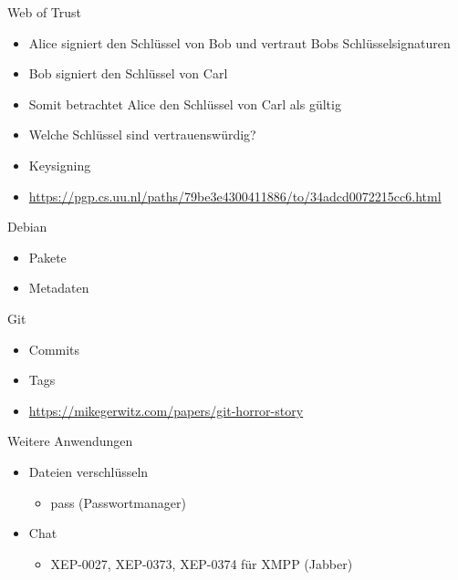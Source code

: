 \documentclass{beamer}
\begin{document}
\begin{frame}{Web of Trust}
    \begin{itemize}
        \item Alice signiert den Schlüssel von Bob und vertraut Bobs Schlüsselsignaturen
        \item Bob signiert den Schlüssel von Carl
        \item Somit betrachtet Alice den Schlüssel von Carl als gültig
    \end{itemize}
    \pause
    \begin{itemize}
        \item Welche Schlüssel sind vertrauenswürdig?
        \item Keysigning
        \item \url{https://pgp.cs.uu.nl/paths/79be3e4300411886/to/34adcd0072215cc6.html}
    \end{itemize}
\end{frame}

\begin{frame}{Debian}
    \begin{itemize}
        \item Pakete
        \item Metadaten
    \end{itemize}
\end{frame}

\begin{frame}{Git}
    \begin{itemize}
        \item Commits
        \item Tags
        \item \url{https://mikegerwitz.com/papers/git-horror-story}
    \end{itemize}
\end{frame}

\begin{frame}{Weitere Anwendungen}
    \begin{itemize}
        \item Dateien verschlüsseln
            \begin{itemize}
                \item pass (Passwortmanager)
            \end{itemize}
        \item Chat
            \begin{itemize}
                \item XEP-0027, XEP-0373, XEP-0374 für XMPP (Jabber)
            \end{itemize}
    \end{itemize}
\end{frame}
\end{document}

